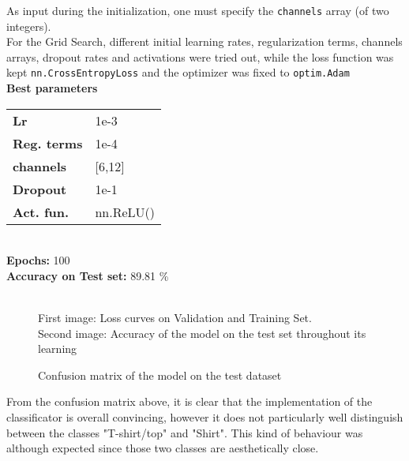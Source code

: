 \documentclass[11pt,a4paper,twocolumn]{IEEEtran}
\newcommand{\thinsepline}{\noindent\makebox[\linewidth]{\rule{7.5cm}{0.02pt}}}
\newcommand{\thinnersepline}{\noindent\makebox[\linewidth]{\rule{7.5cm}{0.01pt}}}
\begin{document}
			As input during the initialization, one must specify the \texttt{channels} array (of two integers).\medskip\\
			For the Grid Search, different initial learning rates, regularization terms, channels arrays, dropout rates and activations were tried out, while the loss function was kept \texttt{nn.CrossEntropyLoss} and the optimizer was fixed to \texttt{optim.Adam}
			\thinsepline\\
			\textbf{Best parameters}\medskip\\
			\begin{tabular}{ll}
				\textbf{Lr}	& 1e-3 \\
				\textbf{Reg. terms}	& 1e-4 \\
				\textbf{channels} & [6,12] \\
				\textbf{Dropout} & 1e-1 \\
				\textbf{Act. fun.} & nn.ReLU() \\
			\end{tabular}
			\thinnersepline\\
			\textbf{Epochs:} 100\\
			\textbf{Accuracy on Test set:} 89.81 \%\vspace*{-.2cm}\\
			\thinsepline\vspace*{-.7cm}\\
			\newpage
			\begin{figure}[h]
				\centering
				
				\caption{First image: Loss curves on Validation and Training Set.\\ Second image: Accuracy of the model on the test set throughout its learning}
			\end{figure}
			\begin{figure}[h]
				\centering
				
				\caption{Confusion matrix of the model on the test dataset}
			\end{figure}
			From the confusion matrix above, it is clear that the implementation of the classificator is overall convincing, however it does not particularly well distinguish between the classes "T-shirt/top" and "Shirt". This kind of behaviour was although expected since those two classes are aesthetically close.
\end{document}
